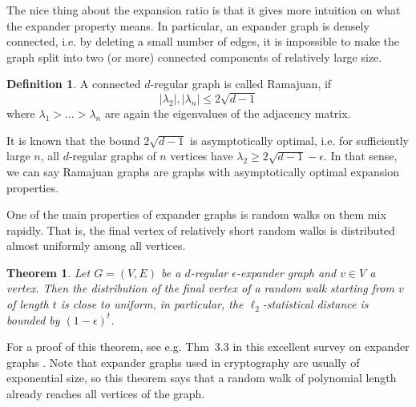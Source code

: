 \documentclass{ociamthesis}
\newtheorem{theorem}[prop]{Theorem}
\theoremstyle{definition}
\newtheorem{definition}[prop]{Definition}
\begin{document}
The nice thing about the expansion ratio is that it gives more intuition on what the expander property means.
In particular, an expander graph is densely connected, i.e. by deleting a small number of edges, it is impossible to make the graph split into two (or more) connected components of relatively large size.
\begin{definition}
    A connected $d$-regular graph is called Ramajuan, if
    \begin{equation*}
        |\lambda_2|, |\lambda_n| \leq 2\sqrt{d - 1}
    \end{equation*}
    where $\lambda_1 > ... > \lambda_n$ are again the eigenvalues of the adjacency matrix.
\end{definition}
It is known that the bound $2\sqrt{d - 1}$ is asymptotically optimal, i.e. for sufficiently large $n$, all $d$-regular graphs of $n$ vertices have $\lambda_2 \geq 2\sqrt{d - 1} - \epsilon$.
In that sense, we can say Ramajuan graphs are graphs with asymptotically optimal expansion properties.

One of the main properties of expander graphs is random walks on them mix rapidly.
That is, the final vertex of relatively short random walks is distributed almost uniformly among all vertices.
\begin{theorem}
    Let $G = (V, E)$ be a $d$-regular $\epsilon$-expander graph and $v \in V$ a vertex.
    Then the distribution of the final vertex of a random walk starting from $v$ of length $t$ is close to uniform, in particular, the $\ell_2$-statistical distance is bounded by $(1 - \epsilon)^t$.
\end{theorem}
For a proof of this theorem, see e.g. Thm~3.3 in this excellent survey on expander graphs \cite{expander_survey}.
Note that expander graphs used in cryptography are usually of exponential size, so this theorem says that a random walk of polynomial length already reaches all vertices of the graph.
\end{document}
